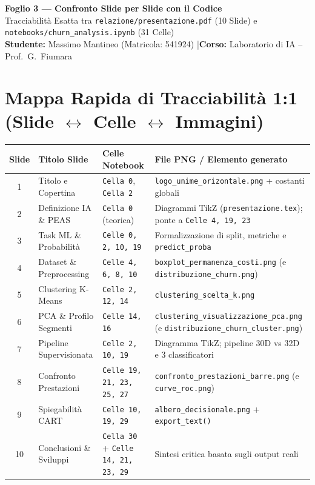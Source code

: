 \documentclass[10pt, a4paper]{article}
\begin{document}
\begin{center}
    {\LARGE \bfseries \color{PrimaryNavy} Foglio 3 --- Confronto Slide per Slide con il Codice}\\[4pt]
    {\large Tracciabilità Esatta tra \texttt{relazione/presentazione.pdf} (10 Slide) e \texttt{notebooks/churn\_analysis.ipynb} (31 Celle)}\\[3pt]
    {\small \textbf{Studente:} Massimo Mantineo (Matricola: 541924) \quad|\quad \textbf{Corso:} Laboratorio di IA -- Prof.\ G.\ Fiumara}
\end{center}

\section*{Mappa Rapida di Tracciabilità 1:1 (Slide $\leftrightarrow$ Celle $\leftrightarrow$ Immagini)}
\begin{center}
\footnotesize
\setlength{\tabcolsep}{4.5pt}
\renewcommand{\arraystretch}{1.15}
\begin{tabularx}{\textwidth}{c l l >{\raggedright\arraybackslash}X}
\toprule
\rowcolor{PrimaryNavy}
\color{white}\textbf{Slide} & \color{white}\textbf{Titolo Slide} & \color{white}\textbf{Celle Notebook} & \color{white}\textbf{File PNG / Elemento generato} \\
\midrule
1 & Titolo e Copertina & \texttt{Cella 0}, \texttt{Cella 2} & \texttt{logo\_unime\_orizontale.png} + costanti globali \\
2 & Definizione IA \& PEAS & \texttt{Cella 0} (teorica) & Diagrammi TikZ (\texttt{presentazione.tex}); ponte a \texttt{Celle 4, 19, 23} \\
3 & Task ML \& Probabilità & \texttt{Celle 0, 2, 10, 19} & Formalizzazione di split, metriche e \texttt{predict\_proba} \\
4 & Dataset \& Preprocessing & \texttt{Celle 4, 6, 8, 10} & \texttt{boxplot\_permanenza\_costi.png} (e \texttt{distribuzione\_churn.png}) \\
5 & Clustering K-Means & \texttt{Celle 2, 12, 14} & \texttt{clustering\_scelta\_k.png} \\
6 & PCA \& Profilo Segmenti & \texttt{Celle 14, 16} & \texttt{clustering\_visualizzazione\_pca.png} (e \texttt{distribuzione\_churn\_cluster.png}) \\
7 & Pipeline Supervisionata & \texttt{Celle 2, 10, 19} & Diagramma TikZ; pipeline 30D vs 32D e 3 classificatori \\
8 & Confronto Prestazioni & \texttt{Celle 19, 21, 23, 25, 27} & \texttt{confronto\_prestazioni\_barre.png} (e \texttt{curve\_roc.png}) \\
9 & Spiegabilità CART & \texttt{Celle 10, 19, 29} & \texttt{albero\_decisionale.png} + \texttt{export\_text()} \\
10 & Conclusioni \& Sviluppi & \texttt{Cella 30} + \texttt{Celle 14, 21, 23, 29} & Sintesi critica basata sugli output reali \\
\bottomrule
\end{tabularx}
\end{center}
\end{document}
